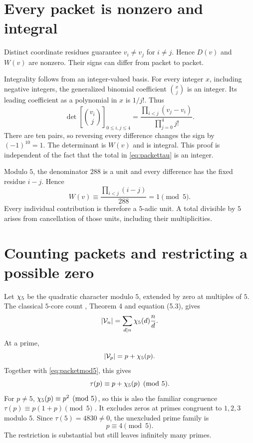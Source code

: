 \section{Every packet is nonzero and integral}
Distinct coordinate residues guarantee $v_i\ne v_j$ for $i\ne j$. Hence $D(v)$ and $W(v)$ are nonzero. Their signs can differ from packet to packet.

Integrality follows from an integer-valued basis. For every integer $x$, including negative integers, the generalized binomial coefficient $\binom{x}{j}$ is an integer. Its leading coefficient as a polynomial in $x$ is $1/j!$. Thus
\begin{equation}
\det\left[\binom{v_i}{j}\right]_{0\le i,j\le4}
=\frac{\prod_{i<j}(v_j-v_i)}{\prod_{j=0}^4j!}.
\end{equation}
There are ten pairs, so reversing every difference changes the sign by $(-1)^{10}=1$. The determinant is $W(v)$ and is integral. This proof is independent of the fact that the total in \eqref{eq:packettau} is an integer.

Modulo $5$, the denominator $288$ is a unit and every difference has the fixed residue $i-j$. Hence
\begin{equation}\label{eq:packetmod5}
W(v)\equiv\frac{\prod_{i<j}(i-j)}{288}=1\pmod5.
\end{equation}
Every individual contribution is therefore a $5$-adic unit. A total divisible by $5$ arises from cancellation of those units, including their multiplicities.

\section{Counting packets and restricting a possible zero}
Let $\chi_5$ be the quadratic character modulo $5$, extended by zero at multiples of $5$. The classical $5$-core count \cite{GKS}, Theorem 4 and equation (5.3), gives
\begin{equation}\label{eq:packetcount}
|\mathcal V_n|=\sum_{d\mid n}\chi_5(d)\frac nd.
\end{equation}
At a prime,
\[
|\mathcal V_p|=p+\chi_5(p).
\]
Together with \eqref{eq:packetmod5}, this gives
\begin{equation}\label{eq:primemod5}
\tau(p)\equiv p+\chi_5(p)\pmod5.
\end{equation}
For $p\ne5$, $\chi_5(p)\equiv p^2\pmod5$, so this is also the familiar congruence $\tau(p)\equiv p(1+p)\pmod5$ \cite{BCO}. It excludes zeros at primes congruent to $1,2,3$ modulo $5$. Since $\tau(5)=4830\ne0$, the unexcluded prime family is
\[
p\equiv4\pmod5.
\]
The restriction is substantial but still leaves infinitely many primes.


